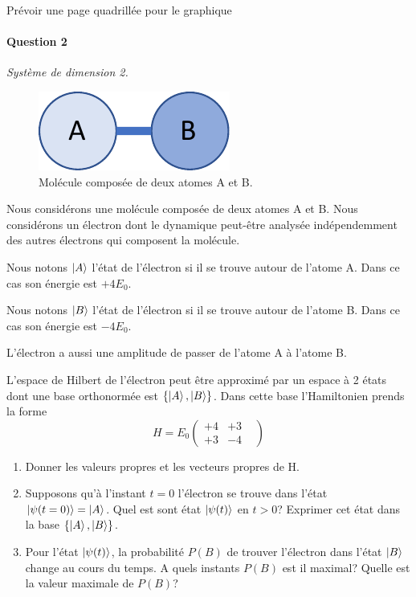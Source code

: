 \newpage
Prévoir une page quadrillée pour le graphique

\newpage

\newpage

\paragraph{Question 2} \textit{Système de dimension 2.} \\

\begin{figure}[h!]
\begin{center}
\includegraphics[width=0.3\columnwidth]{Pictures/AB.pdf} 
\end{center}
\caption{Molécule composée de deux atomes A et B.
}
\label{fig:AB}
\end{figure}

Nous considérons une molécule composée de deux atomes A et B. Nous considérons un électron dont le dynamique peut-être analysée indépendemment des autres électrons qui composent la molécule.

Nous notons $\ket{A}$ l'état de l'électron si il se trouve autour de l'atome A. Dans ce cas son énergie est $+ 4 E_0$.

Nous notons $\ket{B}$ l'état de l'électron si il se trouve autour de l'atome B. Dans ce cas son énergie est $- 4 E_0$.

L'électron a aussi une amplitude de passer de l'atome A à l'atome B.

L'espace de Hilbert de l'électron peut être approximé par un espace à 2 états dont une base orthonormée est $\{\ket{A}, \ket{B}\}$. Dans cette base l'Hamiltonien prends la forme
\begin{equation}
H = E_0 \begin{pmatrix}
+4 & +3 \\
+3 & -4 & 
\end{pmatrix}
\end{equation}

\begin{enumerate}
\item Donner les valeurs propres et les vecteurs propres de H.

\item Supposons qu'à l'instant $t=0$ l'électron se trouve dans l'état $\ket{\psi(t=0)}=\ket{A}$. Quel est sont état $\ket{\psi(t)}$ en $t>0$? Exprimer cet état dans la base $\{\ket{A}, \ket{B}\}$.

\item Pour l'état $\ket{\psi(t)}$, la probabilité $P(B)$ de trouver l'électron dans l'état $\ket{B}$ change au cours du temps. A quels instants  $P(B)$ est il maximal? Quelle est la valeur maximale de $P(B)$?

\end{enumerate}


